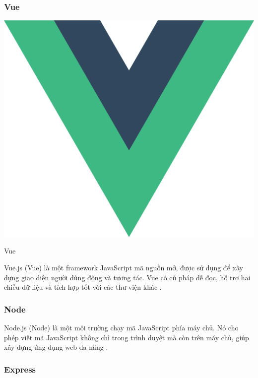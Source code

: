 \subsubsection{Vue}
\begin{center}
  \begin{minipage}{.3\linewidth}
    \captionsetup{type=figure, width=.93\linewidth}
    \includegraphics[width=\linewidth]{images/vue.png}
    \caption{\centering Vue}
    \label{fig:vue}
  \end{minipage}%
\end{center}

Vue.js (Vue) là một framework JavaScript mã nguồn mở, được sử dụng để xây dựng giao diện người dùng động và tương tác.
Vue có cú pháp dễ đọc, hỗ trợ hai chiều dữ liệu và tích hợp tốt với các thư viện khác \cite{vue}.

\subsubsection{Node}

Node.js (Node) là một môi trường chạy mã JavaScript phía máy chủ.
Nó cho phép viết mã JavaScript không chỉ trong trình duyệt mà còn trên máy chủ, giúp xây dựng ứng dụng web đa năng \cite{node}.

\subsubsection{Express}

